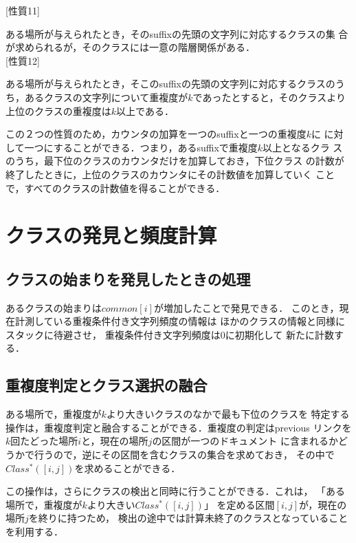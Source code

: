 [性質11]\par
ある場所が与えられたとき，そのsuffixの先頭の文字列に対応するクラスの集
合が求められるが，そのクラスには一意の階層関係がある．\\

[性質12]\par
ある場所が与えられたとき，そこのsuffixの先頭の文字列に対応するクラスのう
ち，あるクラスの文字列について重複度が$k$であったとすると，そのクラスより
上位のクラスの重複度は$k$以上である．\par

この２つの性質のため，カウンタの加算を一つのsuffixと一つの重複度$k$に
に対して一つにすることができる．つまり，あるsuffixで重複度$k$以上となるクラ
スのうち，最下位のクラスのカウンタだけを加算しておき，下位クラス
の計数が終了したときに，上位のクラスのカウンタにその計数値を加算していく
ことで，すべてのクラスの計数値を得ることができる．

\section{クラスの発見と頻度計算}

\subsection{クラスの始まりを発見したときの処理}
あるクラスの始まりは$common[i]$が増加したことで発見できる．
このとき，現在計測している重複条件付き文字列頻度の情報は
ほかのクラスの情報と同様にスタックに待避させ，
重複条件付き文字列頻度は0に初期化して
新たに計数する．

\subsection{重複度判定とクラス選択の融合}

ある場所で，重複度が$k$より大きいクラスのなかで最も下位のクラスを
特定する操作は，重複度判定と融合することができる．重複度の判定はprevious
リンクを$k$回たどった場所$i$と，現在の場所$j$の区間が一つのドキュメント
に含まれるかどうかで行うので，逆にその区間を含むクラスの集合を求めておき，
その中で$Class^{\ast}([i,j])$を求めることができる．\par

この操作は，さらにクラスの検出と同時に行うことができる．これは，
「ある場所で，重複度が$k$より大きい$Class^{\ast}([i,j])$」
を定める区間$[i,j]$が，現在の場所$j$を終りに持つため，
検出の途中では計算未終了のクラスとなっていることを利用する．\par

